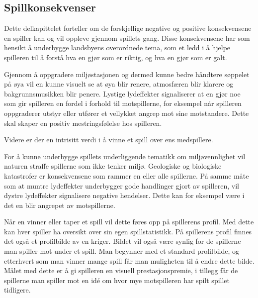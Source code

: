 \subsection{Spillkonsekvenser}
Dette delkapittelet forteller om de forskjellige negative og positive
konsekvensene en spiller kan og vil oppleve gjennom spillets gang. Disse konsekvensene har som hensikt å underbygge landsbyens overordnede tema, som et ledd i å hjelpe spilleren til å forstå hva en gjør som er riktig, og hva en gjør som er galt.

Gjennom å oppgradere miljøstasjonen og dermed kunne bedre håndtere søppelet på øya vil en kunne visuelt se at øya blir renere, atmosfæren blir klarere og bakgrunnsmusikken blir penere. Lystige lydeffekter signaliserer at en gjør noe som gir spilleren en fordel i forhold til motspillerne, for eksempel når spilleren oppgraderer utstyr eller utfører et vellykket angrep mot sine
motstandere. Dette skal skaper en positiv mestringsfølelse hos spilleren. 

Videre er der en intrisitt verdi i å vinne et spill over ens
medspillere.

For å kunne underbygge spillets underliggende tematikk om
miljøvennlighet vil naturen straffe spillerne som ikke tenker miljø.
Geologiske og biologiske katastrofer er konsekvensene som rammer en
eller alle spillerne.
På samme måte som at muntre lydeffekter underbygger gode handlinger
gjort av spilleren, vil dystre lydeffekter signalisere negative
hendelser. Dette kan for eksempel være i det en blir angrepet av
motspillerne. 

Når en vinner eller taper et spill vil dette føres opp på spillerens
profil. Med dette kan hver spiller ha oversikt over sin egen
spillstatistikk. På spillerens profil finnes det også et profilbilde av
en kriger. Bildet vil også være synlig for de spillerne man spiller mot
under et spill. Man begynner med et standard profilbilde, og etterhvert
som man vinner mange spill får man muligheten til å endre dette bilde.
Målet med dette er å gi spilleren en visuell prestasjonspremie, i
tillegg får de spillerne man spiller mot en idé om hvor mye motspilleren
har spilt spillet tidligere.



